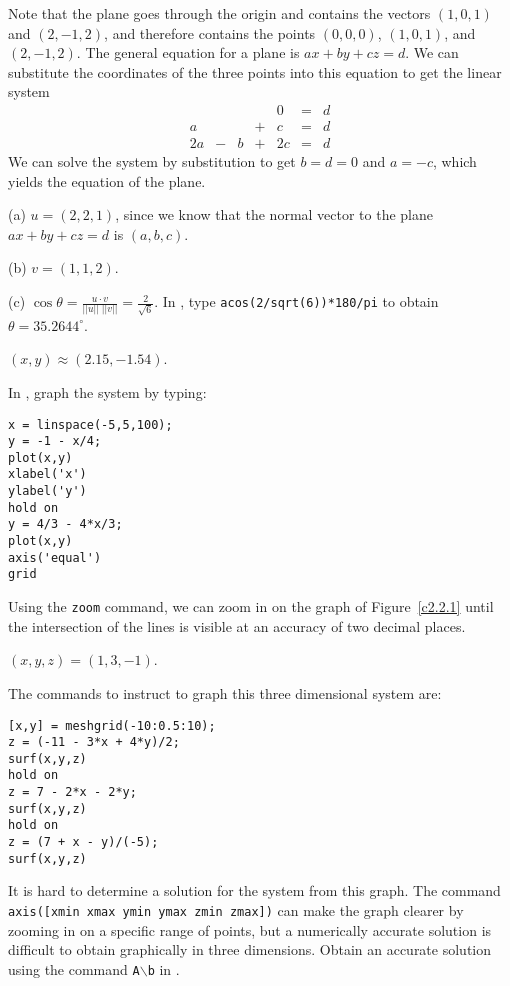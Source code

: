 \soln Note that the plane goes through the origin and contains the
vectors $(1,0,1)$ and $(2,-1,2)$, and therefore contains the points
$(0,0,0)$, $(1,0,1)$, and $(2,-1,2)$.  The general equation for a plane
is $ax + by + cz = d$.  We can substitute the coordinates of the three
points into this equation to get the linear system
\[
\begin{array}{rrrrrrr}
 & & & & 0 & = & d \\
a & & & + & c & = & d \\
2a & - & b & + & 2c & = & d\end{array}
\]
We can solve the system by substitution to get $b = d = 0$ and $a = -c$,
which yields the equation of the plane.

(a) $u = (2,2,1)$, since we know that the normal vector to the plane
$ax + by + cz = d$ is $(a,b,c)$.

(b) $v = (1,1,2)$.

(c) $\cos\theta = \frac{u \cdot v}{||u||\;||v||} = \frac{2}{\sqrt{6}}$.
In \Matlabp, type {\tt acos(2/sqrt(6))*180/pi} to obtain $\theta =
35.2644^\circ$.

\ans $(x,y) \approx (2.15,-1.54)$.

\soln In \Matlab, graph the system by typing:
\begin{verbatim}
x = linspace(-5,5,100);
y = -1 - x/4;
plot(x,y)
xlabel('x')
ylabel('y')
hold on
y = 4/3 - 4*x/3;
plot(x,y)
axis('equal')
grid
\end{verbatim}

Using the {\tt zoom} command, we can zoom in on the graph of
Figure~\ref{c2.2.1} until the intersection of the lines is
visible at an accuracy of two decimal places.  

\begin{figure}[htb]
                       \centerline{%
                       }
\end{figure}

\ans $(x,y,z) = (1,3,-1)$.

\soln The commands to instruct \Matlab to graph this three dimensional
system are:
\begin{verbatim}
[x,y] = meshgrid(-10:0.5:10);
z = (-11 - 3*x + 4*y)/2;
surf(x,y,z)
hold on 
z = 7 - 2*x - 2*y;
surf(x,y,z)
hold on
z = (7 + x - y)/(-5);
surf(x,y,z)
\end{verbatim}
It is hard to determine a solution for the system from this graph.
The command {\tt axis([xmin xmax ymin ymax zmin zmax])} can make the
graph clearer by zooming in on a specific range of points, but a
numerically accurate solution is difficult to obtain graphically in
three dimensions.  Obtain an accurate solution using the command
{\tt A}$\backslash${\tt b} in \Matlabp.

